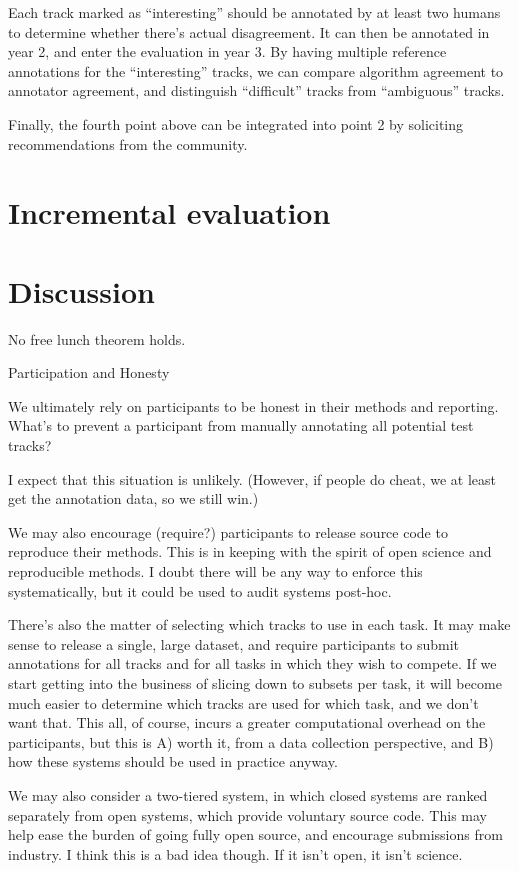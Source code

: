 \documentclass{article}
\begin{document}
Each track marked as “interesting” should be annotated by at least two humans to determine whether there’s actual disagreement.  It can then be annotated in year 2, and enter the evaluation in year 3.  By having multiple reference annotations for the “interesting” tracks, we can compare algorithm agreement to annotator agreement, and distinguish “difficult” tracks from “ambiguous” tracks.

Finally, the fourth point above can be integrated into point 2 by soliciting recommendations from the community.

\section{Incremental evaluation}


\section{Discussion}

No free lunch theorem holds.

Participation and Honesty

We ultimately rely on participants to be honest in their methods and reporting.  What’s to prevent a participant from manually annotating all potential test tracks?

I expect that this situation is unlikely.  (However, if people do cheat, we at least get the annotation data, so we still win.)

We may also encourage (require?) participants to release source code to reproduce their methods.  This is in keeping with the spirit of open science and reproducible methods.  I doubt there will be any way to enforce this systematically, but it could be used to audit systems post-hoc.

There’s also the matter of selecting which tracks to use in each task.  It may make sense to release a single, large dataset, and require participants to submit annotations for all tracks and for all tasks in which they wish to compete.  If we start getting into the business of slicing down to subsets per task, it will become much easier to determine which tracks are used for which task, and we don’t want that.  This all, of course, incurs a greater computational overhead on the participants, but this is A) worth it, from a data collection perspective, and B) how these systems should be used in practice anyway.

We may also consider a two-tiered system, in which closed systems are ranked separately from open systems, which provide voluntary source code.  This may help ease the burden of going fully open source, and encourage submissions from industry.  I think this is a bad idea though.  If it isn’t open, it isn’t science.
\end{document}
